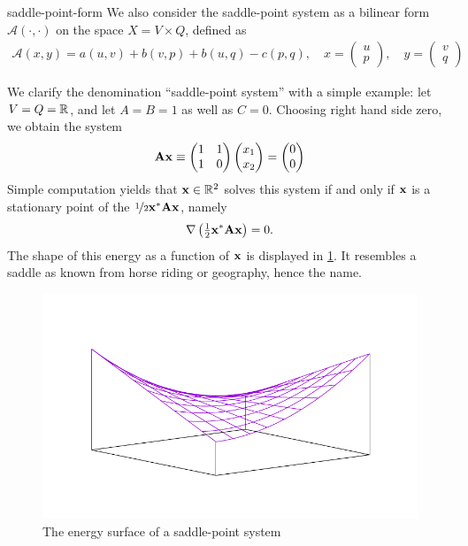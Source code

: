 \begin{Notation}{saddle-point-form}
  We also consider the saddle-point system as a bilinear form $\mathcal A(\cdot,\cdot)$ on the space $X = V\times Q$, defined as
  \begin{gather}
    \mathcal A(x,y)
    = a(u,v) + b(v,p) + b(u,q) - c(p,q),
    \quad x =
    \begin{pmatrix}
      u\\p
    \end{pmatrix}
    ,\quad y=
    \begin{pmatrix}
      v\\q
    \end{pmatrix}
  \end{gather}
\end{Notation}

\begin{example}
  We clarify the denomination ``saddle-point system'' with a simple
  example: let $V = Q = \mathbb R$, and let $A=B=1$ as well as
  $C=0$. Choosing right hand side zero, we obtain the system
  \begin{gather}
    \mathbf A \mathbf x \equiv
    \begin{pmatrix}
      1 & 1 \\1 & 0
    \end{pmatrix}
    \begin{pmatrix}
      x_1 \\ x_2
    \end{pmatrix}
    =
    \begin{pmatrix}
     0\\0
    \end{pmatrix}
  \end{gather}
  Simple computation yields that $\mathbf x\in \mathbb R^2$ solves this system if
  and only if $\mathbf x$ is a stationary point of the 
  $\nicefrac12\mathbf x^*\mathbf A\mathbf x$, namely
  \begin{gather}
    \nabla \left(\tfrac12\mathbf x^*\mathbf A\mathbf x\right) = 0.
  \end{gather}
  The shape of this energy as a function of $\mathbf x$ is displayed in
  \cref{fig:saddle}. It resembles a saddle as known from horse riding
  or geography, hence the name.
\end{example}
\begin{figure}[tp]
  \centering
  \includegraphics[width=.8\textwidth]{mixed/graph/saddle}
  \caption{The energy surface of a saddle-point system}
  \label{fig:saddle}
\end{figure}

